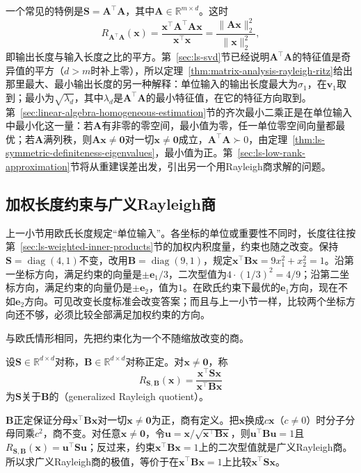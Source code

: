 一个常见的特例是$\bm S=\bm A^\top\bm A$，其中$\bm A\in\mathbb R^{m\times d}$。这时
\[
 R_{\bm A^\top\bm A}(\bm x)=\frac{\bm x^\top\bm A^\top\bm A\bm x}{\bm x^\top\bm x}=\frac{\lVert\bm A\bm x\rVert_2^2}{\lVert\bm x\rVert_2^2},
\]
即输出长度与输入长度之比的平方。第~\ref{sec:ls-svd}节已经说明$\bm A^\top\bm A$的特征值是奇异值的平方（$d>m$时补上零），所以定理~\ref{thm:matrix-analysis-rayleigh-ritz}给出那里最大、最小输出长度的另一种解释：单位输入的输出长度最大为$\sigma_1$，在$\bm v_1$取到；最小为$\sqrt{\lambda_d}$，其中$\lambda_d$是$\bm A^\top\bm A$的最小特征值，在它的特征方向取到。第~\ref{sec:linear-algebra-homogeneous-estimation}节的齐次最小二乘正是在单位输入中最小化这一量：若$\bm A$有非零的零空间，最小值为零，任一单位零空间向量都最优；若$\bm A$满列秩，则$\bm A\bm x\neq\bm0$对一切$\bm x\neq\bm0$成立，$\bm A^\top\bm A\succ0$，由定理~\ref{thm:ls-symmetric-definiteness-eigenvalues}，最小值为正。第~\ref{sec:ls-low-rank-approximation}节将从重建误差出发，引出另一个用Rayleigh商求解的问题。

\subsection{加权长度约束与广义Rayleigh商}
\label{sec:ls-generalized-rayleigh}

上一小节用欧氏长度规定“单位输入”。各坐标的单位或重要性不同时，长度往往按第~\ref{sec:ls-weighted-inner-products}节的加权内积度量，约束也随之改变。保持$\bm S=\operatorname{diag}(4,1)$不变，改用$\bm B=\operatorname{diag}(9,1)$，规定$\bm x^\top\bm B\bm x=9x_1^2+x_2^2=1$。沿第一坐标方向，满足约束的向量是$\pm\bm e_1/3$，二次型值为$4\cdot(1/3)^2=4/9$；沿第二坐标方向，满足约束的向量仍是$\pm\bm e_2$，值为$1$。在欧氏约束下最优的$\bm e_1$方向，现在不如$\bm e_2$方向。可见改变长度标准会改变答案；而且与上一小节一样，比较两个坐标方向还不够，必须比较全部满足加权约束的方向。

与欧氏情形相同，先把约束化为一个不随缩放改变的商。
\begin{definition}[广义Rayleigh商]
\label{def:ls-generalized-rayleigh-quotient}
设$\bm S\in\mathbb R^{d\times d}$对称，$\bm B\in\mathbb R^{d\times d}$对称正定。对$\bm x\neq\bm0$，称
\begin{equation}
 R_{\bm S,\bm B}(\bm x)=\frac{\bm x^\top\bm S\bm x}{\bm x^\top\bm B\bm x}
 \label{eq:ls-generalized-rayleigh-quotient}
\end{equation}
为$\bm S$关于$\bm B$的（generalized Rayleigh quotient）。
\end{definition}
$\bm B$正定保证分母$\bm x^\top\bm B\bm x$对一切$\bm x\neq\bm0$为正，商有定义。把$\bm x$换成$c\bm x$（$c\neq0$）时分子分母同乘$c^2$，商不变。对任意$\bm x\neq\bm0$，令$\bm u=\bm x/\sqrt{\bm x^\top\bm B\bm x}$，则$\bm u^\top\bm B\bm u=1$且$R_{\bm S,\bm B}(\bm x)=\bm u^\top\bm S\bm u$；反过来，约束$\bm x^\top\bm B\bm x=1$上的二次型值就是广义Rayleigh商。所以求广义Rayleigh商的极值，等价于在$\bm x^\top\bm B\bm x=1$上比较$\bm x^\top\bm S\bm x$。

